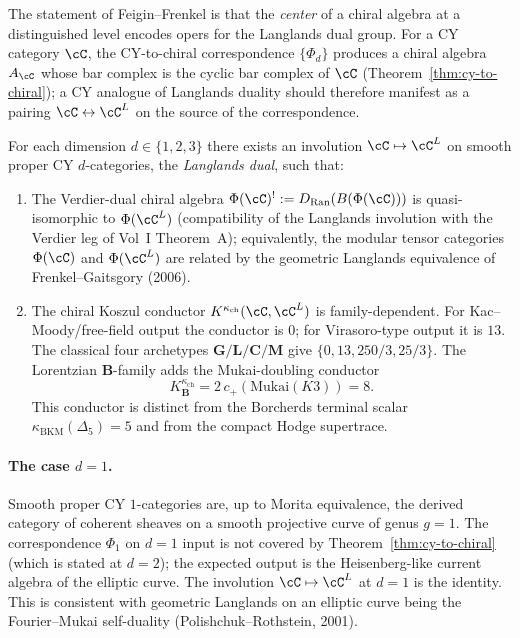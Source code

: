 The statement of Feigin--Frenkel is that the \emph{center} of a chiral algebra at a distinguished level encodes opers for the Langlands dual group. For a CY category $\cC$, the CY-to-chiral correspondence $\{\Phi_d\}$ produces a chiral algebra $A_\cC$ whose bar complex is the cyclic bar complex of $\cC$ (Theorem~\ref{thm:cy-to-chiral}); a CY analogue of Langlands duality should therefore manifest as a pairing $\cC \leftrightarrow \cC^L$ on the source of the correspondence.

\begin{conjecture}[CY Langlands]
\label{conj:cy-langlands}
\ClaimStatusConjectured
For each dimension $d \in \{1, 2, 3\}$ there exists an involution $\cC \mapsto \cC^L$ on smooth proper CY $d$-categories, the \emph{Langlands dual}, such that:
\begin{enumerate}[label=(\roman*)]
 \item The Verdier-dual chiral algebra $\Phi(\cC)^! := D_{\mathrm{Ran}}(B(\Phi(\cC)))$ is quasi-isomorphic to $\Phi(\cC^L)$ (compatibility of the Langlands involution with the Verdier leg of Vol~I Theorem~A); equivalently, the modular tensor categories $\Phi(\cC)$ and $\Phi(\cC^L)$ are related by the geometric Langlands equivalence of Frenkel--Gaitsgory (2006).
 \item The chiral Koszul conductor
 \(K^{\kappa_{\mathrm{ch}}}(\cC,\cC^L)\) is family-dependent.  For
 Kac--Moody/free-field output the conductor is \(0\); for Virasoro-type
 output it is \(13\).  The classical four archetypes
 \(\mathbf G/\mathbf L/\mathbf C/\mathbf M\) give
 \(\{0,13,250/3,25/3\}\).  The Lorentzian
 \(\mathbf B\)-family adds the Mukai-doubling conductor
 \[
 K^{\kappa_{\mathrm{ch}}}_{\mathbf B}
   =2\,c_+(\mathrm{Mukai}(K3))=8.
 \]
 This conductor is distinct from the Borcherds terminal scalar
 \(\kappa_{\mathrm{BKM}}(\Delta_5)=5\) and from the compact Hodge
 supertrace.

\end{enumerate}
\end{conjecture}

\paragraph{The case \texorpdfstring{$d = 1$}{d = 1}.} Smooth proper CY $1$-categories are, up to Morita equivalence, the derived category of coherent sheaves on a smooth projective curve of genus $g = 1$. The correspondence $\Phi_1$ on $d = 1$ input is not covered by Theorem~\ref{thm:cy-to-chiral} (which is stated at $d = 2$); the expected output is the Heisenberg-like current algebra of the elliptic curve. The involution $\cC \mapsto \cC^L$ at $d = 1$ is the identity. This is consistent with geometric Langlands on an elliptic curve being the Fourier--Mukai self-duality (Polishchuk--Rothstein, 2001).

